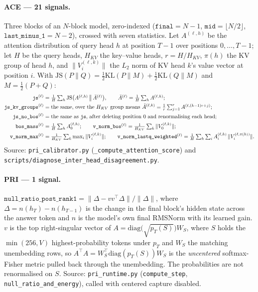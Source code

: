 \documentclass[11pt]{article}
\begin{document}
\paragraph{ACE --- 21 signals.} Three blocks of an $N$-block model, zero-indexed
($\texttt{final}=N-1$, $\texttt{mid}=\lfloor N/2\rfloor$, $\texttt{last\_minus\_1}=N-2$), crossed
with seven statistics. Let $A^{(\ell,h)}$ be the attention distribution of query head $h$ at position
$T-1$ over positions $0,\dots,T-1$; let $H$ be the query heads, $H_{KV}$ the key--value heads,
$r=H/H_{KV}$, $\pi(h)$ the KV group of head $h$, and $\|V^{(\ell,k)}_i\|$ the $L_2$ norm of KV head
$k$'s value vector at position $i$. With
$\mathrm{JS}(P\|Q)=\tfrac12\mathrm{KL}(P\|M)+\tfrac12\mathrm{KL}(Q\|M)$ and $M=\tfrac12(P+Q)$:
\begin{align*}
\texttt{js}^{(\ell)} &= \tfrac{1}{H}\textstyle\sum_h \mathrm{JS}\big(A^{(\ell,h)}\,\big\|\,\bar A^{(\ell)}\big),
\qquad \bar A^{(\ell)}=\tfrac1H\textstyle\sum_h A^{(\ell,h)};\\
\texttt{js\_kv\_groups}^{(\ell)} &= \text{the same, over the $H_{KV}$ group means }
\tilde A^{(\ell,k)}=\tfrac1r\textstyle\sum_{j=1}^{r}A^{(\ell,(k-1)r+j)};\\
\texttt{js\_no\_bos}^{(\ell)} &= \text{the same as \texttt{js}, after deleting position $0$ and renormalising each head};\\
\texttt{bos\_mass}^{(\ell)} &= \tfrac1H\textstyle\sum_h A^{(\ell,h)}_0;
\qquad \texttt{v\_norm\_bos}^{(\ell)} = \tfrac{1}{H_{KV}}\textstyle\sum_k \|V^{(\ell,k)}_0\|;\\
\texttt{v\_norm\_max}^{(\ell)} &= \tfrac{1}{H_{KV}}\textstyle\sum_k \max_i \|V^{(\ell,k)}_i\|;
\qquad \texttt{v\_norm\_lastq\_weighted}^{(\ell)} = \tfrac1H\textstyle\sum_h\textstyle\sum_i A^{(\ell,h)}_i\,\|V^{(\ell,\pi(h))}_i\|.
\end{align*}
Source: \texttt{pri\_calibrator.py} (\texttt{\_compute\_attention\_score}) and
\texttt{scripts/diagnose\_inter\_head\_disagreement.py}.

\paragraph{PRI --- 1 signal.} $\texttt{null\_ratio\_post\_rank1}=\|\Delta-vv^{\top}\Delta\|/\|\Delta\|$,
where $\Delta=n(h_T)-n(h_{T-1})$ is the change in the final block's hidden state across the answer
token and $n$ is the model's own final RMSNorm with its learned gain. $v$ is the top right-singular
vector of $A=\mathrm{diag}\big(\sqrt{p_T(S)}\big)W_S$, where $S$ holds the $\min(256,V)$
highest-probability tokens under $p_T$ and $W_S$ the matching unembedding rows, so
$A^{\top}A=W_S^{\top}\mathrm{diag}(p_T(S))W_S$ is the \emph{uncentered} softmax-Fisher metric pulled
back through the unembedding. The probabilities are not renormalised on $S$. Source:
\texttt{pri\_runtime.py} (\texttt{compute\_step}, \texttt{null\_ratio\_and\_energy}), called with
centered capture disabled.
\end{document}

